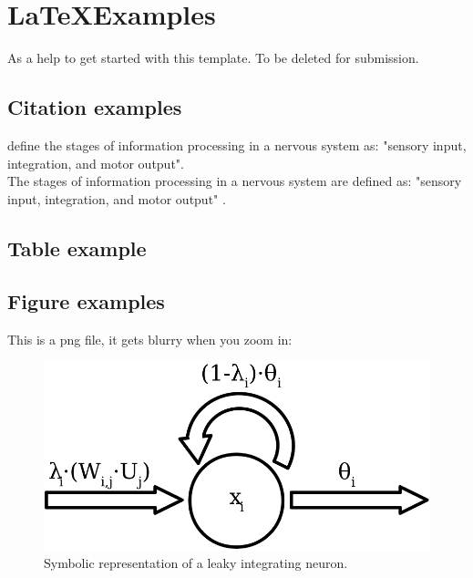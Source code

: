 \newpage
\section{\LaTeX Examples}
As a help to get started with this template. To be deleted for submission.
\subsection{Citation examples}
\citet{campbell:2017} define the stages of information processing in a nervous system as: "sensory input, integration, and motor output". \\
The stages of information processing in a nervous system are defined as: "sensory input, integration, and motor output" \citep{campbell:2017}. 

\subsection{Table example}


\subsection{Figure examples}
This is a png file, it gets blurry when you zoom in:
\begin{figure}[htbp]
    \centering
    \includegraphics[width=.7\textwidth]{figures/leaky_integration.png}
    \caption{Symbolic representation of a leaky integrating neuron.}
    \label{fig:leaky_integration}
\end{figure}

